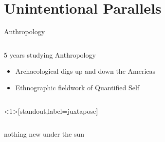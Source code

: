\documentclass[presentation]{subfiles}
\begin{document}
\section{Unintentional Parallels}





\begin{frame}{\hspace{0.5em}Anthropology}

  \begin{columns}
  \begin{column}{0.5\textwidth}
  5 years studying Anthropology

  \begin{itemize}
    \item Archaeological digs up and down the Americas
    \item {Ethnographic fieldwork} of Quantified Self
  \end{itemize}
  \end{column}
  
  \begin{column}{0.5\textwidth}
  \end{column}
  \end{columns}

\end{frame}







\begin{frame}<1>[standout,label=juxtapose]
  \begin{columns}
    \begin{column}{0.5\textwidth}
      \begin{center}
        {\large nothing new under the sun}
      \end{center}
    \end{column}
    \begin{column}{0.5\textwidth}
      \begin{center}
      \end{center}
    \end{column}
  \end{columns}
\end{frame}
\end{document}
